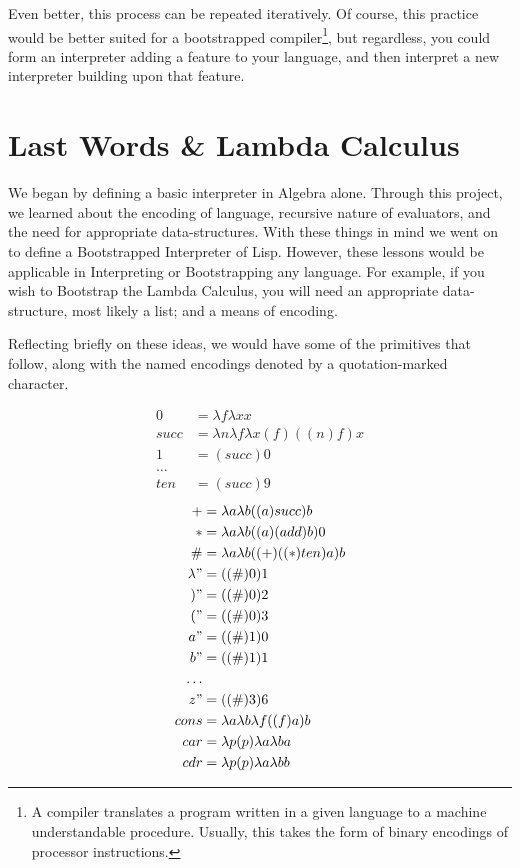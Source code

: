 \documentclass{article}
\begin{document}
Even better, this process can be repeated iteratively. Of course, this practice would be better suited for a 
bootstrapped compiler\footnote{A compiler translates a program written in a given language to a machine
understandable procedure. Usually, this takes the form of binary encodings of processor instructions.}, but
regardless, you could form an interpreter adding a feature to your language, and then interpret a new
interpreter building upon that feature.

\section{Last Words \& Lambda Calculus}
We began by defining a basic interpreter in Algebra alone. Through this project, we learned about the
encoding of language, recursive nature of evaluators, and the need for appropriate data-structures. With these
things in mind we went on to define a Bootstrapped Interpreter of Lisp. However, these lessons would be
applicable in Interpreting or Bootstrapping any language. For example, if you wish to Bootstrap the Lambda
Calculus, you will need an appropriate data-structure, most likely a list; and a means of encoding.

Reflecting briefly on these ideas, we would have some of the primitives that follow, along with the named
encodings denoted by a quotation-marked character.

\begin{align*}
    0 &= \lambda f \lambda x x
\\  succ &= \lambda n \lambda f \lambda x (f)((n)f)x
\\  1 &= (succ)0
\\  \dots
\\  ten &= (succ)9
\end{align*}
\begin{align*}
    + &= \lambda a \lambda b ((a)succ)b
\\  * &= \lambda a \lambda b ((a)(add)b)0
\\  \# &= \lambda a \lambda b ((+)((*)ten)a)b
\\  \lambda " &= ((\#)0)1
\\  ) " &= ((\#)0)2
\\  ( " &= ((\#)0)3
\\  a " &= ((\#)1)0
\\  b " &= ((\#)1)1
\\  \dots
\\  z " &= ((\#)3)6
\\  cons &= \lambda a \lambda b \lambda f ((f)a)b
\\  car &= \lambda p (p) \lambda a \lambda b a
\\  cdr &= \lambda p (p) \lambda a \lambda b b
\end{align*}
\end{document}
